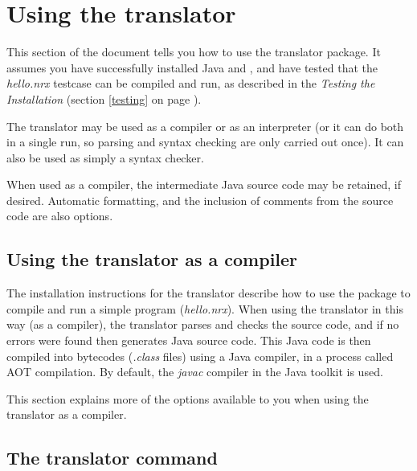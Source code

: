

\chapter{Using the translator}
This section of the document tells you how to use the
translator package.  It assumes you have successfully installed Java and
\nr{}, and have tested that the \emph{hello.nrx} testcase can be
compiled and run, as described in the \emph{Testing the
\nr{} Installation} (section \ref{testing} on page \pageref{testing}).

The \nr{} translator may be used as a compiler or as an interpreter
(or it can do both in a single run, so parsing and syntax checking are
only carried out once).  It can also be used as simply a syntax checker.

When used as a compiler, the intermediate Java source code may be
retained, if desired.  Automatic formatting, and the inclusion of comments
from the \nr{} source code are also options.

\section{Using the translator as a compiler}
The installation instructions for the \nr{} translator describe how to
use the package to compile and run a simple \nr{} program
(\emph{hello.nrx}).  When using the translator in this way (as a
compiler), the translator parses and checks the \nr{} source code, and
if no errors were found then generates Java source code.  This Java
code is then compiled into bytecodes
(\emph{.class} files) using a Java compiler, in a process called AOT
compilation. By default,
the \emph{javac} compiler in the Java toolkit is used.

This section explains more of the options available to you when using
the translator as a compiler.
\section{The translator command}

